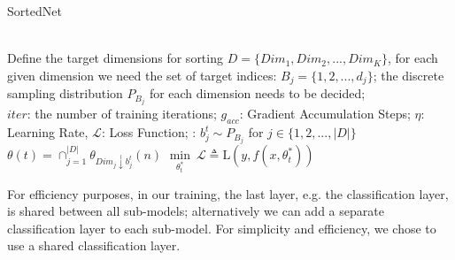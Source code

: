 \documentclass[letterpaper]{article} %
\begin{document}
\begin{algorithm}[htb!]
\caption{SortedNet}\label{alg:two}
\begin{algorithmic}
\REQUIRE \\
Define the target dimensions for sorting $D= \{ Dim_1, Dim_2, ..., Dim_K \}$, for each given dimension we need the set of target indices: $B_j = \{ 1,2, ..., d_j \} $; the discrete sampling distribution $P_{B_j}$ for each dimension needs to be decided;\\ 
$iter$: the number of training iterations; $g_{acc}$: Gradient Accumulation Steps; $\eta$: Learning Rate, $\mathcal{L}$: Loss Function; 
:
    \STATE $b_j^t \sim P_{B_j}$  for $j \in \{1,2, ..., |D|\}$ 
    \STATE $\theta (t) = \cap_{j=1}^{|D|} \theta_{Dim_j\downarrow b_j^t}(n) $
    \STATE $\underset{\theta_t^*}{\min} ~\mathcal{L} \triangleq \text{L}(y, f(x,\theta_t^*))$
    \ENDIF
\ENDWHILE

\end{algorithmic}
\label{alg}
\end{algorithm}


For efficiency purposes, in our training, the last layer, e.g. the  classification layer, is shared between all sub-models; alternatively we can add a separate classification layer to each sub-model. For simplicity and efficiency, we chose to use a shared classification layer. %


\end{document}

